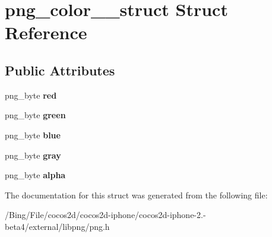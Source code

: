 \hypertarget{structpng__color__8__struct}{\section{png\-\_\-color\-\_\-\_\-struct Struct Reference}
\label{structpng__color__8__struct}
}
\subsection*{Public Attributes}
\begin{DoxyCompactItemize}
\item 
\hypertarget{structpng__color__8__struct_a5cd91bb4b3429256b84e6f28c72778b8}{png\-\_\-byte {\bfseries red}}\label{structpng__color__8__struct_a5cd91bb4b3429256b84e6f28c72778b8}

\item 
\hypertarget{structpng__color__8__struct_a40d053224177df35c037525b39563b05}{png\-\_\-byte {\bfseries green}}\label{structpng__color__8__struct_a40d053224177df35c037525b39563b05}

\item 
\hypertarget{structpng__color__8__struct_a58225d3b6426185d5a40d3c9935db96a}{png\-\_\-byte {\bfseries blue}}\label{structpng__color__8__struct_a58225d3b6426185d5a40d3c9935db96a}

\item 
\hypertarget{structpng__color__8__struct_a574edc173d956cca144927262e88653e}{png\-\_\-byte {\bfseries gray}}\label{structpng__color__8__struct_a574edc173d956cca144927262e88653e}

\item 
\hypertarget{structpng__color__8__struct_af1c7203aefe12bd35dc9a4cdd58e7a4b}{png\-\_\-byte {\bfseries alpha}}\label{structpng__color__8__struct_af1c7203aefe12bd35dc9a4cdd58e7a4b}

\end{DoxyCompactItemize}


The documentation for this struct was generated from the following file\-:\begin{DoxyCompactItemize}
\item 
/\-Bing/\-File/cocos2d/cocos2d-\/iphone/cocos2d-\/iphone-\/2.-\/beta4/external/libpng/png.\-h\end{DoxyCompactItemize}

